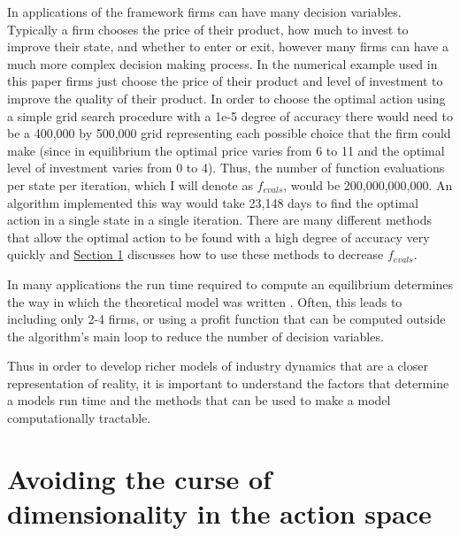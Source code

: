 \documentclass[12pt]{article}
\begin{document}
In applications of the \citet{1995_Erickson_Pakes_RES} framework firms can have many decision variables. Typically a firm chooses the price of their product, how much to invest to improve their state, and whether to enter or exit, however many firms can have a much more complex decision making process. In the numerical example used in this paper firms just choose the price of their product and level of investment to improve the quality of their product. In order to choose the optimal action using a simple grid search procedure with a 1e-5 degree of accuracy there would need to be a 400,000 by 500,000 grid representing each possible choice that the firm could make (since in equilibrium the optimal price varies from 6 to 11 and the optimal level of investment varies from 0 to 4). Thus, the number of function evaluations per state per iteration, which I will denote as $f_{evals}$, would be 200,000,000,000. An algorithm implemented this way would take 23,148 days to find the optimal action in a single state in a single iteration. There are many different methods that allow the optimal action to be found with a high degree of accuracy very quickly and \hyperref[action]{Section \ref{action}} discusses how to use these methods to decrease $f_{evals}$.

In many applications the run time required to compute an equilibrium determines the way in which the theoretical model was written \citep{2007_Doraszelski_Pakes, 2015_Benkard_Weintraub_Jeziorski_RAND}. Often, this leads to including only 2-4 firms, or using a profit function that can be computed outside the algorithm's main loop to reduce the number of decision variables.

Thus in order to develop richer models of industry dynamics that are a closer representation of reality, it is important to understand the factors that determine a models run time and the methods that can be used to make a model computationally tractable.

\section{Avoiding the curse of dimensionality in the action space}
\label{action}
\end{document}
